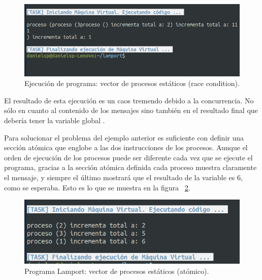 \begin{figure}[h]
    \includegraphics[width=\linewidth]{images/ejemplos/concurrentes/vector_process.png}
    \caption{Ejecución de programa: vector de procesos estáticos (race condition).}
    \label{fig:lamportProcessVector_exec}
\end{figure}

El resultado de esta ejecución es un caos tremendo debido a la concurrencia. No sólo en cuanto al contenido de los mensajes sino también en el resultado final que debería tener la variable global .

Para solucionar el problema del ejemplo anterior es suficiente con definir una sección atómica que englobe a las dos instrucciones de los procesos. Aunque el orden de ejecución de los procesos puede ser diferente cada vez que se ejecute el programa, gracias a la sección atómica definida cada proceso muestra claramente el mensaje, y siempre el último mostrará que el resultado de la variable  es 6, como se esperaba. Esto es lo que se muestra en la figura ~\ref{fig:lamportProcessVectorAtomic_exec}.

\begin{figure}[h]
    \includegraphics[width=\linewidth]{images/ejemplos/concurrentes/vector_process_atomic.png}
    \caption{Programa Lamport: vector de procesos estáticos (atómico).}
    \label{fig:lamportProcessVectorAtomic_exec}
\end{figure}



\newpage
